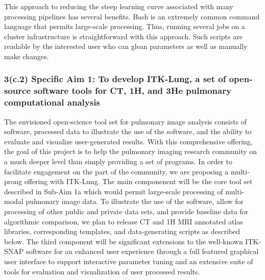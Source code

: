 \documentclass[11pt,]{article}
\newenvironment{Shaded}{\begin{snugshade}}{\end{snugshade}}
\newcommand{\KeywordTok}[1]{\textcolor[rgb]{0.13,0.29,0.53}{\textbf{{#1}}}}
\newcommand{\CommentTok}[1]{\textcolor[rgb]{0.56,0.35,0.01}{\textit{{#1}}}}
\newcommand{\NormalTok}[1]{{#1}}
\begin{document}
\begin{Shaded}
\end{Shaded}

This approach to reducing the steep learning curve associated with many
processing pipelines has several benefits. Bash is an extremely common
command language that permits large-scale processing. Thus, running
several jobs on a cluster infrastructure is straightforward with this
approach. Such scripts are readable by the interested user who can glean
parameters as well as manually make changes.

\subsubsection{3(c.2) \textbf{Specific Aim 1:} To develop ITK-Lung, a
set of open-source software tools for CT, 1H, and 3He pulmonary
computational
analysis}\label{c.2-specific-aim-1-to-develop-itk-lung-a-set-of-open-source-software-tools-for-ct-1h-and-3he-pulmonary-computational-analysis}

The envisioned open-science tool set for pulmonary image analysis
consists of software, processed data to illustrate the use of the
software, and the ability to evaluate and visualize user-generated
results. With this comprehensive offering, the goal of this project is
to help the pulmonary imaging research community on a much deeper level
than simply providing a set of programs. In order to facilitate
engagement on the part of the community, we are proposing a multi-prong
offering with ITK-Lung. The main componenent will be the core tool set
described in Sub-Aim 1a which would permit large-scale processing of
multi-modal pulmonary image data. To illustrate the use of the software,
allow for processing of other public and private data sets, and provide
baseline data for algorithmic comparison, we plan to release CT and 1H
MRI annotated atlas libraries, corresponding templates, and
data-generating scripts as described below. The third component will be
significant extensions to the well-known ITK-SNAP software for an
enhanced user experience through a full featured graphical user
interface to support interactive parameter tuning and an extensive suite
of tools for evaluation and visualization of user processed results.
\end{document}
